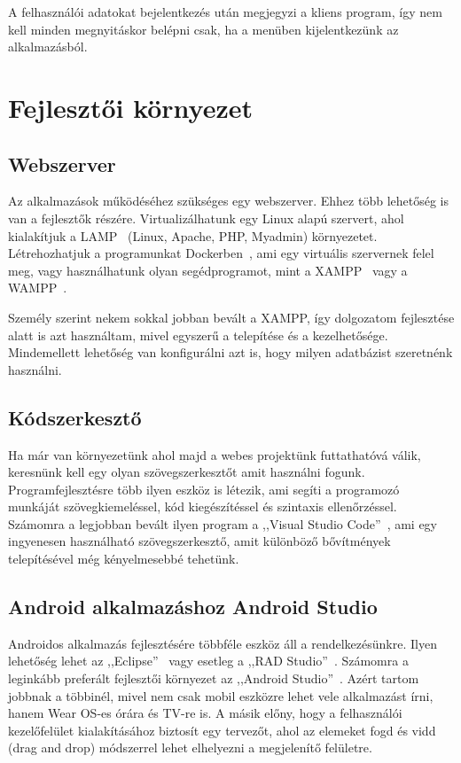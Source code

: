 \documentclass[
]{thesis-ekf}
\theoremstyle{definition}
\theoremstyle{remark}
\begin{document}
	A felhasználói adatokat bejelentkezés után megjegyzi a kliens program, így nem kell minden megnyitáskor belépni csak, ha a menüben kijelentkezünk az alkalmazásból. 
	
	\chapter{Fejlesztői környezet}
	\section{Webszerver}
	Az alkalmazások működéséhez szükséges egy webszerver. Ehhez több lehetőség is van a fejlesztők részére. Virtualizálhatunk egy Linux alapú szervert, ahol kialakítjuk a LAMP~\cite{lamp_book} (Linux, Apache, PHP, Myadmin) környezetet. Létrehozhatjuk a programunkat Dockerben~\cite{docker_doc}, ami egy virtuális szervernek felel meg, vagy használhatunk olyan segédprogramot, mint a XAMPP~\cite{xampp_doc} vagy a WAMPP~\cite{wamp_doc}. 
	
	Személy szerint nekem sokkal jobban bevált a XAMPP, így dolgozatom fejlesztése alatt is azt használtam, mivel egyszerű a telepítése és a kezelhetősége. Mindemellett lehetőség van konfigurálni azt is, hogy milyen adatbázist szeretnénk használni. 
	
	\section{Kódszerkesztő}
	Ha már van környezetünk ahol majd a webes projektünk futtathatóvá válik, keresnünk kell egy olyan szövegszerkesztőt amit használni fogunk. Programfejlesztésre több ilyen eszköz is létezik, ami segíti a programozó munkáját szövegkiemeléssel, kód kiegészítéssel és szintaxis ellenőrzéssel. Számomra a legjobban bevált ilyen program a ,,Visual Studio Code''~\cite{vsc_doc}, ami egy ingyenesen használható szövegszerkesztő, amit különböző bővítmények telepítésével még kényelmesebbé tehetünk.
	
	\section{Android alkalmazáshoz Android Studio}
	Androidos alkalmazás fejlesztésére többféle eszköz áll a rendelkezésünkre. Ilyen lehetőség lehet az ,,Eclipse''~\cite{eclipse_doc} vagy esetleg a ,,RAD Studio''~\cite{rad_doc}. Számomra a leginkább preferált fejlesztői környezet az ,,Android Studio''~\cite{androidStudio_doc}. Azért tartom jobbnak a többinél, mivel nem csak mobil eszközre lehet vele alkalmazást írni, hanem Wear OS-es órára és TV-re is. A másik előny, hogy a felhasználói kezelőfelület kialakításához biztosít egy tervezőt, ahol az elemeket fogd és vidd (drag and drop) módszerrel lehet elhelyezni a megjelenítő felületre. 
	
\end{document}
